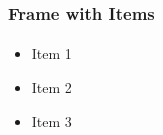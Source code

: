 \documentclass{beamer}
\begin{document}
\begin{frame}
  \frametitle{Frame with Items}
  \framesubtitle{}

  \begin{itemize}[<+->]

    \item Item 1
    \item Item 2
    \item Item 3
    
  \end{itemize}

\end{frame}
\end{document}
